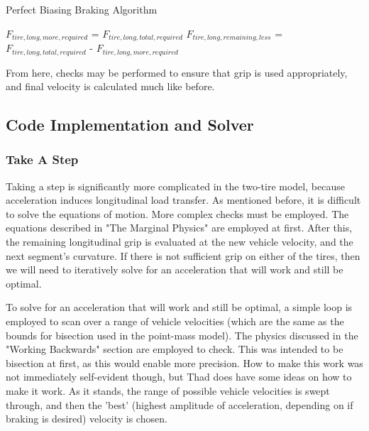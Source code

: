 \documentclass{article}
\begin{document}
\begin{algorithm}[H]
\caption{Perfect Biasing Braking Algorithm}
\begin{algorithmic}[1]
	\State $F_{tire,long,more,required}$ = $F_{tire,long,total,required}$
	\State	$F_{tire,long,remaining,less}$ = $F_{tire,long,total,required}$ - $F_{tire,long,more,required}$
	\EndIf
\end{algorithmic}
\end{algorithm}

From here, checks may be performed to ensure that grip is used appropriately, and final velocity is calculated much like before.



\subsection{Code Implementation and Solver}

\subsubsection{Take A Step}

Taking a step is significantly more complicated in the two-tire model, because acceleration induces longitudinal load transfer. As mentioned before, it is difficult to solve the equations of motion. More complex checks must be employed. The equations described in "The Marginal Physics" are employed at first. After this, the remaining longitudinal grip is evaluated at the new vehicle velocity, and the next segment's curvature. If there is not sufficient grip on either of the tires, then we will need to iteratively solve for an acceleration that will work and still be optimal.

To solve for an acceleration that will work and still be optimal, a simple loop is employed to scan over a range of vehicle velocities (which are the same as the bounds for bisection used in the point-mass model). The physics discussed in the "Working Backwards" section are employed to check. This was intended to be bisection at first, as this would enable more precision. How to make this work was not immediately self-evident though, but Thad does have some ideas on how to make it work. As it stands, the range of possible vehicle velocities is swept through, and then the 'best' (highest amplitude of acceleration, depending on if braking is desired) velocity is chosen.
\end{document}
